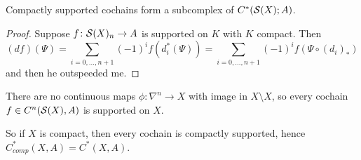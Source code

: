 \documentclass[language=english]{TemplateLecture}
\begin{document}
\begin{proposition}
    Compactly supported cochains form a subcomplex of \(C^*(\mathcal{S}(X); A)\).
\end{proposition}
\begin{proof}
    Suppose \(f\colon \mathcal{S}(X)_n \to A\) is supported on \(K\) with \(K\) compact. Then
    \[(df)(\Psi) = \sum_{i = 0, \dots, n+1} (-1)^{i} f(d_i^*(\Psi)) = \sum_{i = 0, \dots, n+1} (-1)^{i} f(\Psi \circ (d_i)_*)\]
    and then he outspeeded me.
\end{proof}

\begin{example}
    There are no continuous maps \(\phi \colon \nabla^n \to X\) with image in \(X \setminus X\), so every cochain \(f\in C^n(\mathcal{S}(X), A)\) is supported on \(X\).

    So if \(X\) is compact, then every cochain is compactly supported, hence \(C_{comp}^*(X,A) = C^*(X,A)\).
\end{example}
\end{document}
